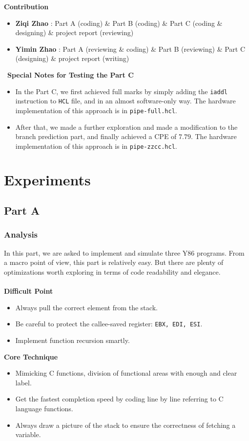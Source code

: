 \documentclass[12pt,a4paper]{article}
\begin{document}
\textbf{Contribution}
\begin{itemize}
	\item \textbf{Ziqi Zhao} : Part A (coding) \& Part B (coding) \& Part C (coding \& designing) \& project report (reviewing)
	\item \textbf{Yimin Zhao} : Part A (reviewing \& coding) \& Part B (reviewing) \& Part C (designing) \& project report (writing)
\end{itemize}
\
\textbf{Special Notes for Testing the Part C}
\begin{itemize}
	\item In the Part C, we first achieved full marks by simply adding the \texttt{iaddl} instruction to \texttt{HCL} file, and in an almost software-only way. The hardware implementation of this approach is in \texttt{pipe-full.hcl}.
	\item After that, we made a further exploration and made a modification to the branch prediction part, and finally achieved a CPE of $7.79$. {\color{blue}The hardware implementation of this approach is in \texttt{pipe-zzcc.hcl}.}
\end{itemize}
\pagebreak
\section{Experiments}
\subsection{Part A}
\subsubsection{Analysis}
In this part, we are asked to implement and simulate three Y86 programs. 
From a macro point of view, this part is relatively easy. 
But there are plenty of optimizations worth exploring in terms of code readability and elegance.\\\\
\textbf{Difficult Point} 
\begin{itemize}
        \item Always pull the correct element from the stack.
        \item Be careful to protect the callee-saved register: \texttt{EBX, EDI, ESI}.
        \item Implement function recursion smartly.
\end{itemize}
\textbf{Core Technique}
\begin{itemize}
        \item Mimicking C functions, division of functional areas with enough and clear label.
        \item Get the fastest completion speed by coding line by line referring to C language functions.
        \item Always draw a picture of the stack to ensure the correctness of fetching a variable.
\end{itemize}
\end{document}
